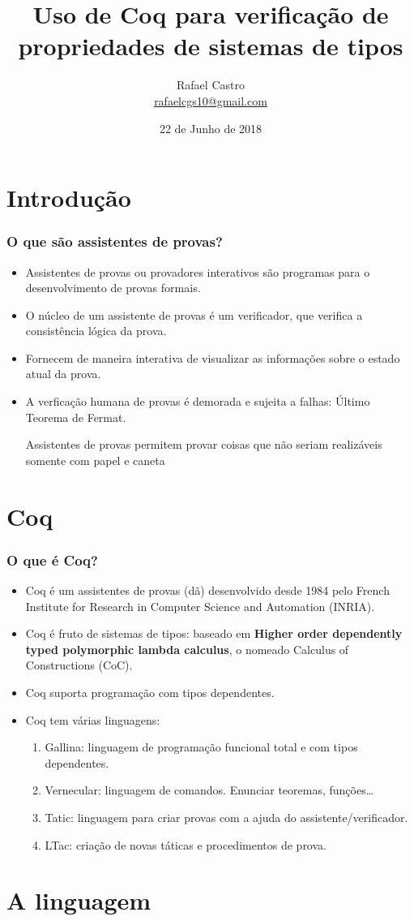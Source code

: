 \documentclass{beamer}
\title[Uso de Coq para verificação de propriedades de sistemas de tipos]{Uso de Coq para verificação de propriedades de sistemas de tipos}
\author[Rafael Castro]{
    Rafael Castro\\\medskip
    {\small \url{rafaelcgs10@gmail.com}}}
\date{22 de Junho de 2018}
\institute[UDESC]{
        Departamento de Ci\^encia da Computa\c{c}\~ao \\
            Centro de Ci\^encias e Tecnol\'ogicas\\
            Universidade do Estado de Santa Catarina}
\begin{document}
\begin{frame}
\titlepage

\end{frame}

\section{Introdução}
\begin{frame}
\frametitle{O que são assistentes de provas?}
\begin{itemize}
    \item Assistentes de provas ou provadores interativos são programas para o desenvolvimento de provas
          formais.
    \item O núcleo de um assistente de provas é um verificador, que verifica a consistência lógica da prova.
    \item Fornecem de maneira interativa de visualizar as informações sobre o estado atual da prova.
    \item A verficação humana de provas é demorada e sujeita a falhas: Último Teorema de Fermat.

      Assistentes de provas permitem provar coisas que não seriam realizáveis somente com papel e caneta
\end{itemize}
\end{frame}

\section{Coq}
\begin{frame}
\frametitle{O que é Coq?}
\begin{itemize}
    \item Coq é um assistentes de provas (dã) desenvolvido desde 1984 pelo French Institute for Research in Computer Science and Automation (INRIA).
    \item Coq é fruto de sistemas de tipos: baseado em \textbf{Higher order dependently typed polymorphic lambda calculus}, o nomeado Calculus of Constructions (CoC).
    \item Coq suporta programação com tipos dependentes.
    \item Coq tem várias linguagens:
        \begin{enumerate}
            \item Gallina: linguagem de programação funcional total e com tipos dependentes.
            \item Vernecular: linguagem de comandos. Enunciar teoremas, funções…
            \item Tatic: linguagem para criar provas com a ajuda do assistente/verificador.
            \item LTac: criação de novas táticas e procedimentos de prova.
        \end{enumerate}
\end{itemize}
\end{frame}

\section{A linguagem}
\end{document}
